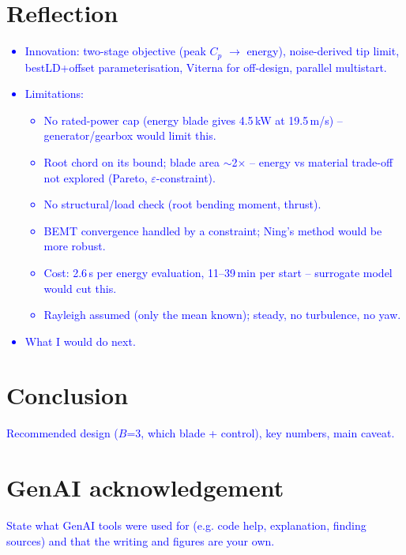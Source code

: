 \documentclass[11pt,a4paper]{article}
\newcommand{\note}[1]{\textcolor{blue}{#1}}
\begin{document}
\section{Reflection}  %
\note{
\begin{itemize}
  \item Innovation: two-stage objective (peak $C_p$ $\to$ energy), noise-derived tip limit, bestLD+offset parameterisation, Viterna for off-design, parallel multistart.
  \item Limitations:
  \begin{itemize}
    \item No rated-power cap (energy blade gives 4.5\,kW at 19.5\,m/s) -- generator/gearbox would limit this.
    \item Root chord on its bound; blade area $\sim$2$\times$ -- energy vs material trade-off not explored (Pareto, $\varepsilon$-constraint).
    \item No structural/load check (root bending moment, thrust).
    \item BEMT convergence handled by a constraint; Ning's method \cite{Ning2014} would be more robust.
    \item Cost: 2.6\,s per energy evaluation, 11--39\,min per start -- surrogate model would cut this.
    \item Rayleigh assumed (only the mean known); steady, no turbulence, no yaw.
  \end{itemize}
  \item What I would do next.
\end{itemize}
}

\section{Conclusion}  %
\note{Recommended design ($B$=3, which blade + control), key numbers, main caveat.}

\section*{GenAI acknowledgement}  %
\note{State what GenAI tools were used for (e.g. code help, explanation, finding sources) and that the writing and figures are your own.}
\end{document}
